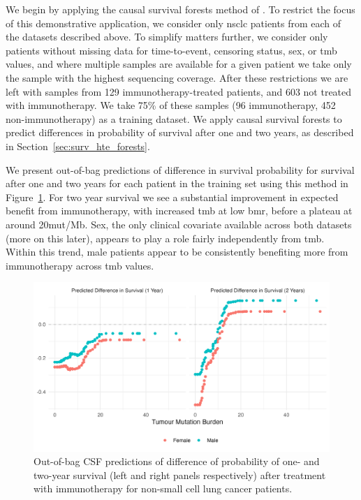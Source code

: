\documentclass[../thesis.tex]{subfiles}
\begin{document}
We begin by applying the causal survival forests method of \citet{cui_estimating_2022}. To restrict the focus of this demonstrative application, we consider only \gls{nsclc} patients from each of the datasets described above. To simplify matters further, we consider only patients without missing data for time-to-event, censoring status, sex, or \gls{tmb} values, and where multiple samples are available for a given patient we take only the sample with the highest sequencing coverage. After these restrictions we are left with samples from 129 immunotherapy-treated patients, and 603 not treated with immunotherapy. We take 75\% of these samples (96 immunotherapy, 452 non-immunotherapy) as a training dataset. We apply causal survival forests to predict differences in probability of survival after one and two years, as described in Section~\ref{sec:surv_hte_forests}.

We present out-of-bag predictions of difference in survival probability for survival after one and two years for each patient in the training set using this method in Figure~\ref{fig:immuno_train_samples_hte_predictions}. For two year survival we see a substantial improvement in expected benefit from immunotherapy, with increased \gls{tmb} at low \gls{bmr}, before a plateau at around 20mut/Mb. Sex, the only clinical covariate available across both datasets (more on this later), appears to play a role fairly independently from \gls{tmb}. Within this trend, male patients appear to be consistently benefiting more from immunotherapy across \gls{tmb} values.

\begin{figure}[!tpb] 
\centering
\includegraphics[width=\textwidth]{figures/chapter4/immuno_train_samples_hte_predictions.png} 

\caption{Out-of-bag CSF predictions of difference of probability of one- and two-year survival (left and right panels respectively) after treatment with immunotherapy for non-small cell lung cancer patients.  \label{fig:immuno_train_samples_hte_predictions}}
\end{figure}
\end{document}
